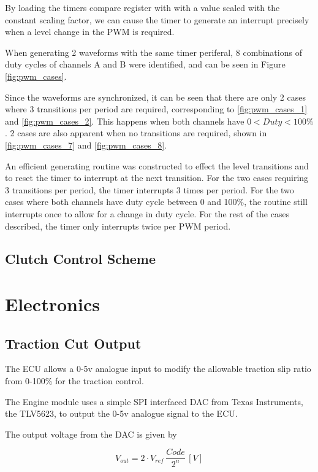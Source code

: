 By loading the timers compare register with with a value scaled with
the constant scaling factor, we can cause the timer to generate an
interrupt precisely when a level change in the PWM is required.

When generating 2 waveforms with the same timer periferal, 8 combinations
of duty cycles of channels A and B were identified, and can be seen
in Figure \ref{fig:pwm_cases}.

Since the waveforms are synchronized, it can be seen that there are
only 2 cases where 3 transitions per period are required, corresponding
to \ref{fig:pwm_cases_1} and \ref{fig:pwm_cases_2}. This happens
when both channels have $0<Duty<100\%$. 2 cases are also apparent
when no transitions are required, shown in \ref{fig:pwm_cases_7}
and \ref{fig:pwm_cases_8}.

An efficient generating routine was constructed to effect the level
transitions and to reset the timer to interrupt at the next transition.
For the two cases requiring 3 transitions per period, the timer interrupts
3 times per period. For the two cases where both channels have duty
cycle between 0 and 100\%, the routine still interrupts once to allow
for a change in duty cycle. For the rest of the cases described, the
timer only interrupts twice per PWM period.




\subsection{Clutch Control Scheme}


\section{Electronics}


\subsection{Traction Cut Output}

The ECU allows a 0-5v analogue input to modify the allowable traction
slip ratio from 0-100\% for the traction control.

The Engine module uses a simple SPI interfaced DAC from Texas Instruments,
the TLV5623, to output the 0-5v analogue signal to the ECU.

The output voltage from the DAC is given by

\begin{equation}
V_{out}=2\cdot{V_{ref}}\,\frac{Code}{2^{n}}\,[V]\end{equation}


